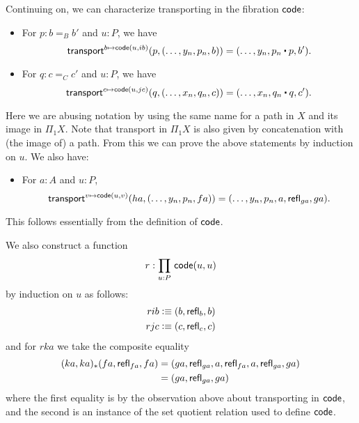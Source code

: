 Continuing on, we can characterize transporting in the fibration $\mathsf{code}$:
\begin{itemize}
\item For $p:b=_B b'$ and $u:P$, we have
  \[ \mathsf{transport}^{b\mapsto \code(u,ib)}(p, (\dots, y_n,p_n,b))
  = (\dots,y_n,p_n\ct p,b').
  \]
\item For $q:c=_C c'$ and $u:P$, we have
  \[ \mathsf{transport}^{c\mapsto \code(u,jc)}(q, (\dots, x_n,q_n,c))
  = (\dots,x_n,q_n\ct q,c').
  \]
\end{itemize}
Here we are abusing notation by using the same name for a path in $X$ and its image in $\Pi_1X$.
Note that transport in $\Pi_1X$ is also given by concatenation with (the image of) a path.
From this we can prove the above statements by induction on $u$.
We also have:
\begin{itemize}
\item For $a:A$ and $u:P$,
  \[ \mathsf{transport}^{v\mapsto \mathsf{code}(u,v)}(ha, (\dots, y_n,p_n,fa))
  = (\dots,y_n,p_n,a,\mathsf{refl}_{ga},ga).
  \]
\end{itemize}
This follows essentially from the definition of $\mathsf{code}$.

We also construct a function
\[ r : \prd{u:P} \code(u,u) \]
by induction on $u$ as follows:
\begin{align*}
  rib &\vcentcolon\equiv (b,\mathsf{refl}_{b},b)\\
  rjc &\vcentcolon\equiv (c,\mathsf{refl}_{c},c)
\end{align*}
and for $rka$ we take the composite equality
\begin{align*}
  (ka,ka)_* (fa,\mathsf{refl}_{fa},fa)
  &= (ga,\mathsf{refl}_{ga},a,\mathsf{refl}_{fa},a,\mathsf{refl}_{ga},ga) \\
  &= (ga,\mathsf{refl}_{ga},ga)
\end{align*}
where the first equality is by the observation above about transporting in $\mathsf{code}$, and the second is an instance of the set quotient relation used to define $\mathsf{code}$.

